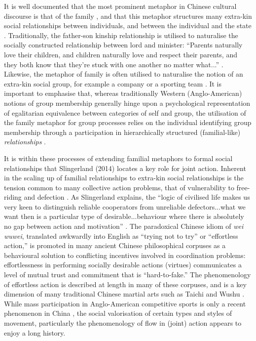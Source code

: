 It is well documented that the most prominent metaphor in Chinese cultural discourse is that of the family \citep{Maehr1980}, and that this metaphor structures many extra-kin social relationships between individuals, and between the individual and the state \citep{Gold2002}.  Traditionally, the father-son kinship relationship is utilised to naturalise the socially constructed relationship between lord and minister: ``Parents naturally love their children, and children naturally love and respect their parents, and they both know that they're stuck with one another no matter what...'' \citep[178]{Slingerland2014}. Likewise, the metaphor of family is often utilised to naturalise the notion of an extra-kin social group, for example a company or a sporting team \citep{Brownell2008}.
It is important to emphasise that, whereas traditionally Western (Anglo-American) notions of group membership generally hinge upon a psychological representation of egalitarian equivalence between categories of self and group, the utilisation of the family metaphor for group processes relies on the individual identifying group membership through a participation in hierarchically structured (familial-like) \textit{relationships} \citep{Fei1992}.

It is within these processes of extending familial metaphors to formal social relationships that Slingerland (2014) locates a key role for joint action. Inherent in the scaling up of familial relationships to extra-kin social relationships is the tension common to many collective action problems, that of vulnerability to free-riding and defection \citep{Cosmides2013,Gavrilets2015}.
As Slingerland explains, the ``logic of civilised life makes us very keen to distinguish reliable cooperators from unreliable defectors...what we want then is a particular type of desirable...behaviour where there is absolutely no gap between action and motivation'' \citep[192]{Slingerland2014}. The paradoxical Chinese idiom of \textit{wei wuwei}, translated awkwardly into English as ``trying not to try'' or ``effortless action,'' is promoted in many ancient Chinese philosophical corpuses as a behavioural solution to conflicting incentives involved in coordination problems: effortlessness in performing socially desirable actions (virtues) communicates a level of mutual trust and commitment that is ``hard-to-fake.''  The phenomenology of effortless action is described at length in many of these corpuses, and is a key dimension of many traditional Chinese martial arts such as Taichi and Wushu \citep{Morris1998}.
While mass participation in Anglo-American competitive sports is only a recent phenomenon in China \citep{Brownell2008}, the social valorisation of certain types and styles of movement, particularly the phenomenology of flow in (joint) action appears to enjoy a long history.


